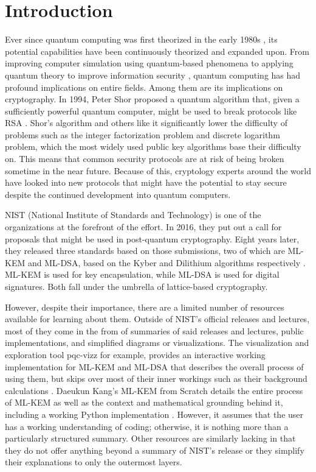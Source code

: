 \documentclass[runningheads]{llncs}
\begin{document}
\section{Introduction}
Ever since quantum computing was first theorized in the early 1980s \cite{benioff1980,benioff1982}, its potential capabilities have been continuously theorized and expanded upon. From improving computer simulation using quantum-based phenomena \cite{feynman1982} to applying quantum theory to improve information security \cite{bennett20147,brassard1543949}, quantum computing has had profound implications on entire fields. Among them are its implications on cryptography. In 1994, Peter Shor proposed a quantum algorithm that, given a sufficiently powerful quantum computer, might be used to break protocols like RSA \cite{shor365700}. Shor's algorithm and others like it significantly lower the difficulty of problems such as the integer factorization problem and discrete logarithm problem, which the most widely used public key algorithms base their difficulty on. This means that common security protocols are at risk of being broken sometime in the near future. Because of this, cryptology experts around the world have looked into new protocols that might have the potential to stay secure despite the continued development into quantum computers. 

NIST (National Institute of Standards and Technology) is one of the organizations at the forefront of the effort. In 2016, they put out a call for proposals that might be used in post-quantum cryptography. Eight years later, they released three standards based on those submissions, two of which are ML-KEM and ML-DSA, based on the Kyber and Dilithium algorithms respectively \cite{nistfips203,nistfips204}. ML-KEM is used for key encapsulation, while ML-DSA is used for digital signatures. Both fall under the umbrella of lattice-based cryptography.

However, despite their importance, there are a limited number of resources available for learning about them. Outside of NIST's official releases and lectures, most of they come in the from of summaries of said releases and lectures, public implementations, and simplified diagrams or visualizations. The visualization and exploration tool pqc-vizz for example, provides an interactive working implementation for ML-KEM and ML-DSA that describes the overall process of using them, but skips over most of their inner workings such as their background calculations \cite{kalava}. Daeukun Kang's ML-KEM from Scratch details the entire process of ML-KEM as well as the context and mathematical grounding behind it, including a working Python implementation \cite{mlkemfromscratch}. However, it assumes that the user has a working understanding of coding; otherwise, it is nothing more than a particularly structured summary. Other resources are similarly lacking in that they do not offer anything beyond a summary of NIST's release or they simplify their explanations to only the outermost layers.
\end{document}
